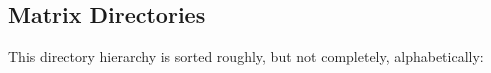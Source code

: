 \subsection{Matrix Directories}
This directory hierarchy is sorted roughly, but not completely, alphabetically:\begin{CompactList}
\item {}
\end{CompactList}

